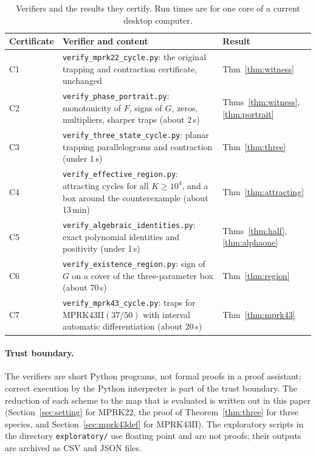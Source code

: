 \documentclass[11pt,a4paper]{article}
\theoremstyle{plain}
\theoremstyle{definition}
\begin{document}
\begin{table}[ht]
\centering\small
\caption{Verifiers and the results they certify. Run times are for one core of a current desktop computer.}\label{tab:verifiers}
\begin{tabularx}{\linewidth}{lXl}
\toprule
Certificate & Verifier and content & Result\\
\midrule
C1 & \texttt{verify\_mprk22\_cycle.py}: the original trapping and contraction certificate, unchanged & Thm~\ref{thm:witness}\\
C2 & \texttt{verify\_phase\_portrait.py}: monotonicity of $F$, signs of $G$, zeros, multipliers, sharper traps (about 2\,s) & Thms~\ref{thm:witness}, \ref{thm:portrait}\\
C3 & \texttt{verify\_three\_state\_cycle.py}: planar trapping parallelograms and contraction (under 1\,s) & Thm~\ref{thm:three}\\
C4 & \texttt{verify\_effective\_region.py}: attracting cycles for all $K\ge10^4$, and a box around the counterexample (about 13\,min) & Thm~\ref{thm:attracting}\\
C5 & \texttt{verify\_algebraic\_identities.py}: exact polynomial identities and positivity (under 1\,s) & Thms~\ref{thm:half}, \ref{thm:alphaone}\\
C6 & \texttt{verify\_existence\_region.py}: sign of $G$ on a cover of the three-parameter box (about 70\,s) & Thm~\ref{thm:region}\\
C7 & \texttt{verify\_mprk43\_cycle.py}: traps for MPRK43II$(37/50)$ with interval automatic differentiation (about 20\,s) & Thm~\ref{thm:mprk43}\\
\bottomrule
\end{tabularx}
\end{table}

\paragraph{Trust boundary.} The verifiers are short Python programs, not formal proofs in a proof assistant; correct execution by the Python interpreter is part of the trust boundary. The reduction of each scheme to the map that is evaluated is written out in this paper (Section~\ref{sec:setting} for MPRK22, the proof of Theorem~\ref{thm:three} for three species, and Section~\ref{sec:mprk43def} for MPRK43II). The exploratory scripts in the directory \texttt{exploratory/} use floating point and are not proofs; their outputs are archived as CSV and JSON files.
\end{document}
